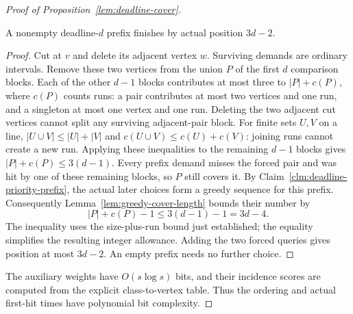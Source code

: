 \begin{proof}[Proof of Proposition~\ref{lem:deadline-cover}]
\begin{claim}
\label{clm:deadline-prefix-length}
A nonempty deadline-$d$ prefix finishes by actual position $3d-2$.
\end{claim}
\begin{proof}
Cut at $v$ and delete its adjacent vertex $w$. Surviving demands are
ordinary intervals. Remove these two vertices from the union $P$
of the first $d$ comparison blocks. Each of the other $d-1$ blocks
contributes at most three to $|P|+c(P)$, where $c(P)$ counts runs:
a pair contributes at most two vertices and one run, and a singleton
at most one vertex and one run. Deleting the two adjacent cut vertices
cannot split any surviving adjacent-pair block. For finite sets
$U,V$ on a line, $|U\cup V|\le|U|+|V|$ and
$c(U\cup V)\le c(U)+c(V)$: joining runs cannot create a new run.
Applying these inequalities to the remaining $d-1$ blocks gives
$|P|+c(P)\le3(d-1)$. Every prefix demand misses the forced pair
and was hit by one of these remaining blocks, so $P$ still covers it.
By Claim~\ref{clm:deadline-priority-prefix}, the actual later
choices form a greedy sequence for this prefix. Consequently
Lemma~\ref{lem:greedy-cover-length} bounds their number by
\[
 |P|+c(P)-1\le3(d-1)-1=3d-4.
\]
The inequality uses the size-plus-run bound just established;
the equality simplifies the resulting integer allowance.
Adding the two forced queries gives position at most $3d-2$. An empty prefix needs no further choice.
\end{proof}
The auxiliary weights have $O(s\log s)$ bits, and their incidence
scores are computed from the explicit class-to-vertex table. Thus the
ordering and actual first-hit times have polynomial bit complexity.
\end{proof}

